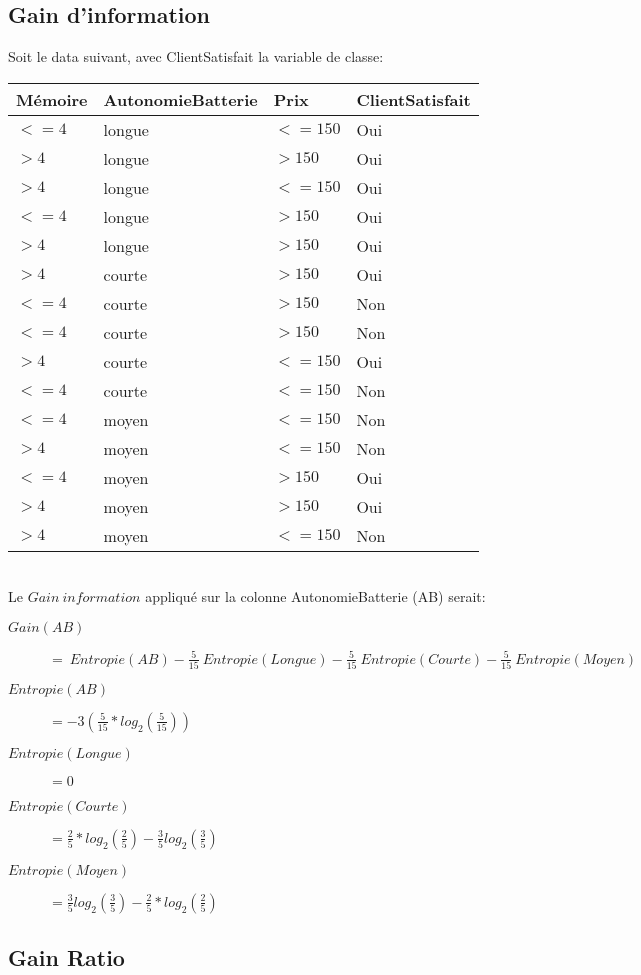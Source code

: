 \subsection{Gain d'information}
Soit le data suivant, avec ClientSatisfait la variable de classe:\\
\begin{tabular}{lll|l}
\hline
Mémoire & AutonomieBatterie & Prix & ClientSatisfait\\
\hline
$<=4$ & longue & $<=150$ & Oui \\
$>4$ & longue & $>150$ & Oui \\
$>4$ & longue & $<=150$ & Oui \\
$<=4$ & longue & $>150$ & Oui \\
$>4$ & longue & $>150$ & Oui \\
$>4$ & courte & $>150$ & Oui \\
$<=4$ & courte & $>150$ & Non \\
$<=4$ & courte & $>150$ & Non \\
$>4$ & courte & $<=150$ & Oui \\
$<=4$ & courte & $<=150$ & Non \\
$<=4$ & moyen & $<=150$ & Non \\
$>4$ & moyen & $<=150$ & Non \\
$<=4$ & moyen & $>150$ & Oui \\
$>4$ & moyen & $>150$ & Oui \\
$>4$ & moyen & $<=150$ & Non \\
\hline
\end{tabular}
\ \\
Le $Gain\ information$ appliqué sur la colonne AutonomieBatterie (AB) serait:\\
\begin{description}
\item[$Gain(AB)$] $ =\ Entropie(AB) - \frac{5}{15}\ Entropie(Longue) - \frac{5}{15}\ Entropie(Courte) - \frac{5}{15}\ Entropie(Moyen)$
\item[$Entropie(AB)$] $ = -3 (\frac{5}{15} * log_2 (\frac{5}{15} ))$
\item[$Entropie(Longue)$] $= 0$
\item[$Entropie(Courte)$] $= \frac{2}{5} * log_2(\frac{2}{5}) - \frac{3}{5} log_2(\frac{3}{5})$
\item[$Entropie(Moyen)$] $= \frac{3}{5} log_2(\frac{3}{5}) - \frac{2}{5} * log_2(\frac{2}{5})$
\end{description}

\subsection{Gain Ratio}

